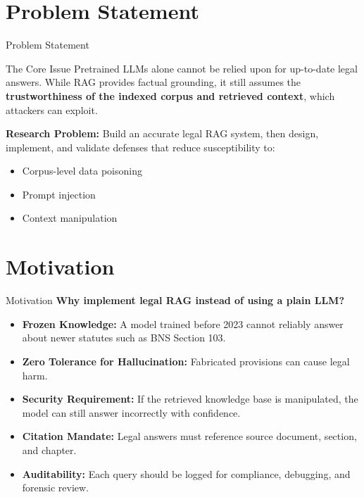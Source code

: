 \documentclass[aspectratio=169]{beamer}
\begin{document}
\section{Problem Statement}
\begin{frame}{Problem Statement}
    \begin{alertblock}{The Core Issue}
        Pretrained LLMs alone cannot be relied upon for up-to-date legal answers. While RAG provides factual grounding, it still assumes the \textbf{trustworthiness of the indexed corpus and retrieved context}, which attackers can exploit.
    \end{alertblock}
    \vspace{0.25cm}
    \small
    \textbf{Research Problem:} Build an accurate legal RAG system, then design, implement, and validate defenses that reduce susceptibility to:
    \begin{itemize}
        \item Corpus-level data poisoning
        \item Prompt injection
        \item Context manipulation
    \end{itemize}
\end{frame}

\section{Motivation}
\begin{frame}{Motivation}
    \small
    \textbf{Why implement legal RAG instead of using a plain LLM?}
    \vspace{0.2cm}
    \begin{itemize}
        \setlength\itemsep{0.5em}
        \item \textbf{Frozen Knowledge:} A model trained before 2023 cannot reliably answer about newer statutes such as BNS Section 103.
        \item \textbf{Zero Tolerance for Hallucination:} Fabricated provisions can cause legal harm.
        \item \textbf{Security Requirement:} If the retrieved knowledge base is manipulated, the model can still answer incorrectly with confidence.
        \item \textbf{Citation Mandate:} Legal answers must reference source document, section, and chapter.
        \item \textbf{Auditability:} Each query should be logged for compliance, debugging, and forensic review.
    \end{itemize}
\end{frame}
\end{document}
